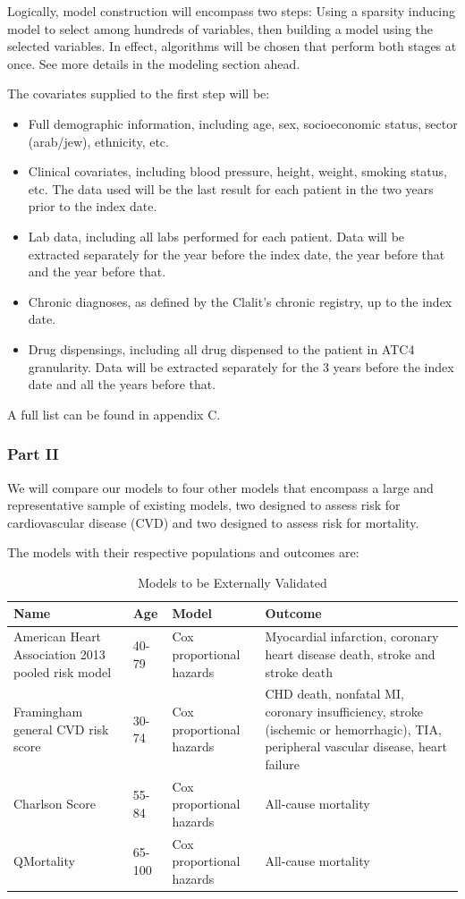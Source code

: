 \documentclass[a4paper,12pt]{article}
\begin{document}
		Logically, model construction will encompass two steps: Using a sparsity inducing model to select among hundreds of variables, then building a model using the selected variables. In effect, algorithms will be chosen that perform both stages at once. See more details in the modeling section ahead.
		
		The covariates supplied to the first step will be: 
		\begin{itemize}
			\item Full demographic information, including age, sex, socioeconomic status, sector (arab/jew), ethnicity, etc.
			\item Clinical covariates, including blood pressure, height, weight, smoking status, etc. The data used will be the last result for each patient in the two years prior to the index date.
			\item Lab data, including all labs performed for each patient. Data will be extracted separately for the year before the index date, the year before that and the year before that.
			\item Chronic diagnoses, as defined by the Clalit's chronic registry\cite{Rennert2001}, up to the index date.
			\item Drug dispensings, including all drug dispensed to the patient in ATC4 granularity\cite{DrugStatisticsMethodology2010}. Data will be extracted separately for the 3 years before the index date and all the years before that.
		\end{itemize}
		A full list can be found in appendix C.
	
		\subsubsection{Part II}
		We will compare our models to four other models that encompass a large and representative sample of existing models, two designed to assess risk for cardiovascular disease (CVD) and two designed to assess risk  for mortality.
		
		The models with their respective populations and outcomes are:
		\begin{table}[H]
		\begin{tabular}{|p{4cm}|p{1cm}|p{3cm}|p{4cm}|}
			\hline
			Name & Age & Model & Outcome \\
			\hline
			American Heart Association 2013 pooled risk model\cite{Goff2014} & 40-79 & Cox proportional hazards & Myocardial infarction, coronary heart disease death, stroke and stroke death \\
			\hline
			Framingham general CVD risk score\cite{DAgostino2008} & 30-74 & Cox proportional hazards & CHD death, nonfatal MI, coronary insufficiency, stroke (ischemic or hemorrhagic), TIA, peripheral vascular disease, heart failure \\
			\hline
			Charlson Score\cite{Charlson1987} & 55-84 & Cox proportional hazards & All-cause mortality \\
			\hline
			QMortality\cite{Hippisley-Cox2017} & 65-100 & Cox proportional hazards & All-cause mortality \\
			\hline
		\end{tabular}
		\caption{Models to be Externally Validated}
		\end{table}
	
\end{document}
